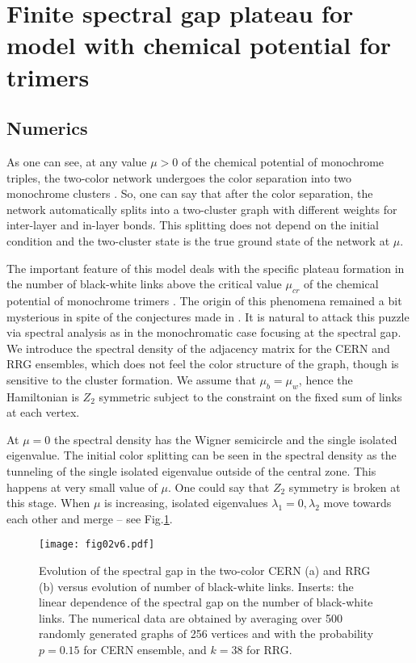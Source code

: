 \documentclass[aps,12pt]{revtex4}
\newcommand{\fig}[1]{Fig.\ref{#1}}
\begin{document}
\section{Finite spectral gap plateau  for model with chemical potential for trimers}

\subsection{Numerics}

As one can see, at any value  $\mu>0$ of the chemical potential of monochrome triples, the two-color network undergoes the color separation into two monochrome clusters \cite{color}. So, one can say that after the color separation, the network automatically splits into a two-cluster graph with different weights for inter-layer and in-layer bonds. This splitting does not depend on the initial condition and the two-cluster state is the true ground state of the network at $\mu$.

The important feature of this model deals with the specific plateau formation in the number of black-white links above the critical value $\mu_{cr}$ of the chemical potential of monochrome trimers \cite{color}. The origin of this phenomena remained a bit mysterious in spite of the conjectures made in \cite{color}. It is natural to attack this puzzle via spectral analysis as in the monochromatic case focusing at the spectral gap. We introduce the spectral density of the adjacency matrix for the CERN and RRG ensembles, which does not feel the color structure of the graph, though is sensitive to the cluster formation. We assume that $\mu_b=\mu_w$, hence the Hamiltonian is $Z_2$ symmetric subject to the constraint on the fixed sum of links at each vertex.

At $\mu=0$ the spectral density has the Wigner semicircle and the single isolated eigenvalue. The initial color splitting can be seen in the spectral density as the tunneling of the single isolated eigenvalue outside of the central zone. This happens at very small value of $\mu$. One could say that $Z_2$ symmetry is broken at this stage. When $\mu$ is increasing, isolated eigenvalues $\lambda_1=0, \lambda_2$ move towards each other and merge -- see \fig{fig:03}.

\begin{figure}[ht]
\centerline{\texttt{[image: fig02v6.pdf]}}
\caption{Evolution of the spectral gap in the two-color CERN (a) and RRG (b) versus evolution of number of black-white links. Inserts: the linear dependence of the spectral gap on the  number of black-white links.  The numerical data are obtained by averaging over 500 randomly generated graphs of 256 vertices and with the probability $p=0.15$ for CERN ensemble, and $k=38$ for RRG.}
\label{fig:03}
\end{figure}
\end{document}
